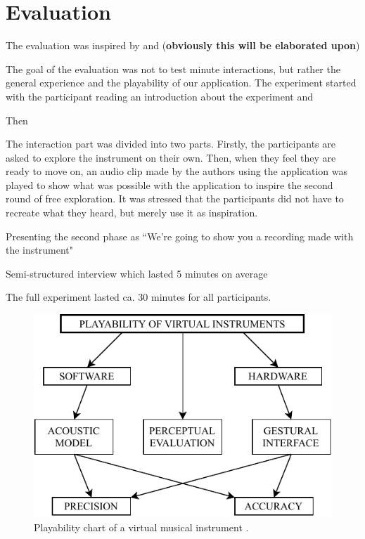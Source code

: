 \documentclass{article}
\begin{document}
\section{Evaluation}
The evaluation was inspired by \cite{Young2003} \cite{Someren1994} \cite{Stowell2009} and \cite{Finstad2010} (\textbf{obviously this will be elaborated upon})

The goal of the evaluation was not to test minute interactions, but rather the general experience and the playability of our application. The experiment started with the participant reading an introduction about the experiment and 

Then

The interaction part was divided into two parts. Firstly, the participants are asked to explore the instrument on their own. Then, when they feel they are ready to move on, an audio clip made by the authors using the application was played to show what was possible with the application to inspire the second round of free exploration. It was stressed that the participants did not have to recreate what they heard, but merely use it as inspiration. 

Presenting the second phase as ``We're going to show you a recording made with the instrument" 

Semi-structured interview which lasted 5 minutes on average

The full experiment lasted ca. 30 minutes for all participants.

\begin{figure}[ht]\includegraphics[width=1.0\columnwidth]{SMC 2020 paper template LaTeX/figures/PlayabilityChart.pdf}
\centering
  \caption{Playability chart of a virtual musical instrument \cite{Young2003}. \label{fig:oculusController}}
\end{figure}
\end{document}
